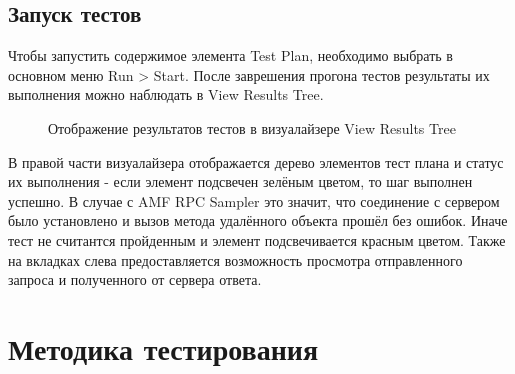 \subsection{Запуск тестов}

Чтобы запустить содержимое элемента Test Plan, необходимо выбрать в основном меню Run > Start.
После заврешения прогона тестов результаты их выполнения можно наблюдать в View Results Tree.

\begin{figure}[ht]
\caption{Отображение результатов тестов в визуалайзере View Results Tree}
\label{ris:testResults.png}
\end{figure}

В правой части визуалайзера отображается дерево элементов тест плана и статус 
их выполнения - если элемент подсвечен зелёным цветом, то шаг выполнен 
успешно. В случае с AMF RPC Sampler это значит, что соединение с сервером было установлено 
и вызов метода удалённого объекта прошёл без ошибок. Иначе тест не считантся пройденным и 
элемент подсвечивается красным цветом. Также на вкладках слева предоставляется 
возможность просмотра отправленного запроса и полученного от сервера ответа.  

\section{Методика тестирования}